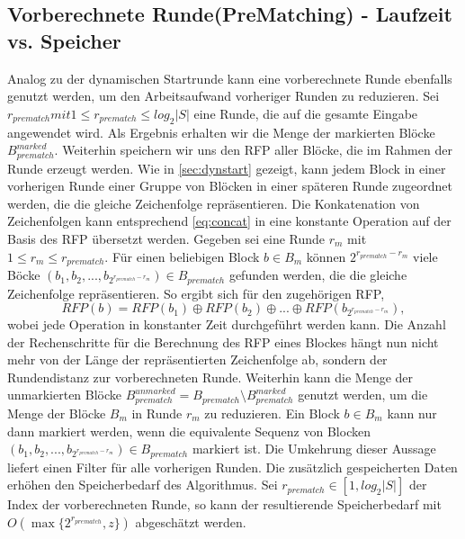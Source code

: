 \subsection{Vorberechnete Runde(PreMatching) - Laufzeit vs. Speicher}
Analog zu der dynamischen Startrunde kann eine vorberechnete Runde ebenfalls genutzt werden, um den Arbeitsaufwand vorheriger Runden zu reduzieren. Sei $r_{prematch} mit 
1\leq r_{prematch} \leq log_2{|S|}$ eine Runde, die auf die gesamte Eingabe angewendet wird. Als Ergebnis erhalten wir die Menge der markierten Blöcke $B_{prematch}^{marked}$.
Weiterhin speichern wir uns den RFP aller Blöcke, die im Rahmen der Runde erzeugt werden. Wie in \ref{sec:dynstart} gezeigt, kann jedem Block in einer vorherigen Runde einer Gruppe
von Blöcken in einer späteren Runde zugeordnet werden, die die gleiche Zeichenfolge repräsentieren. Die Konkatenation von Zeichenfolgen kann entsprechend \ref{eq:concat} in eine
konstante Operation auf der Basis des RFP übersetzt werden. Gegeben sei eine Runde $r_m$ mit $1\leq r_m \leq r_{prematch}$. Für einen beliebigen Block $b \in B_m$ können 
$2^{r_{prematch}-r_m}$ viele Böcke $(b_1, b_2, ..., b_{2^{r_{prematch}-r_m}})\in B_{prematch}$ gefunden werden, die die gleiche Zeichenfolge repräsentieren. So ergibt sich für den 
zugehörigen RFP,
\begin{equation}
    RFP(b) = RFP(b_1) \oplus RFP(b_2) \oplus ... \oplus RFP(b_{2^{r_{prematch}-r_m}}),
\end{equation}
wobei jede Operation in konstanter Zeit durchgeführt werden kann. Die Anzahl der Rechenschritte für die Berechnung des RFP eines Blockes hängt nun nicht mehr von der Länge der
repräsentierten Zeichenfolge ab, sondern der Rundendistanz zur vorberechneten Runde.
Weiterhin kann die Menge der unmarkierten Blöcke $B_{prematch}^{unmarked}=B_{prematch}\setminus B_{prematch}^{marked}$ genutzt werden, um die Menge der Blöcke $B_m$ in Runde $r_m$
zu reduzieren. Ein Block $b \in B_m$ kann nur dann markiert werden, wenn die equivalente Sequenz von Blocken $(b_1, b_2, ..., b_{2^{r_{prematch}-r_m}})\in B_{prematch}$ markiert ist.
Die Umkehrung dieser Aussage liefert einen Filter für alle vorherigen Runden. Die zusätzlich gespeicherten Daten erhöhen den Speicherbedarf des Algorithmus. 
Sei $r_{prematch}\in [1, log_2{|S|}]$ der Index der vorberechneten Runde, so kann der resultierende Speicherbedarf mit $O(\max\{2^{r_{prematch}}, z\})$ abgeschätzt werden.

